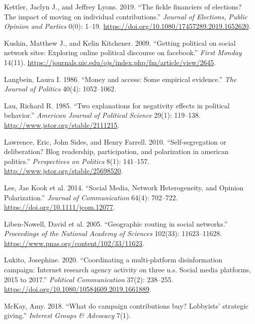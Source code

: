 \documentclass[12pt,]{article}
\begin{document}
\leavevmode\hypertarget{ref-kettler2019}{}%
Kettler, Jaclyn J., and Jeffrey Lyons. 2019. ``The fickle financiers of
elections? The impact of moving on individual contributions.''
\emph{Journal of Elections, Public Opinion and Parties} 0(0): 1--19.
\url{https://doi.org/10.1080/17457289.2019.1652620}.

\leavevmode\hypertarget{ref-kushin2009}{}%
Kushin, Matthew J., and Kelin Kitchener. 2009. ``Getting political on
social network sites: Exploring online political discourse on
facebook.'' \emph{First Monday} 14(11).
\url{https://journals.uic.edu/ojs/index.php/fm/article/view/2645}.

\leavevmode\hypertarget{ref-langbein1986}{}%
Langbein, Laura I. 1986. ``Money and access: Some empirical evidence.''
\emph{The Journal of Politics} 40(4): 1052--1062.

\leavevmode\hypertarget{ref-lau1985}{}%
Lau, Richard R. 1985. ``Two explanations for negativity effects in
political behavior.'' \emph{American Journal of Political Science}
29(1): 119--138. \url{http://www.jstor.org/stable/2111215}.

\leavevmode\hypertarget{ref-lawrence2010}{}%
Lawrence, Eric, John Sides, and Henry Farrell. 2010. ``Self-segregation
or deliberation? Blog readership, participation, and polarization in
american politics.'' \emph{Perspectives on Politics} 8(1): 141--157.
\url{http://www.jstor.org/stable/25698520}.

\leavevmode\hypertarget{ref-lee2014}{}%
Lee, Jae Kook et al. 2014. ``Social Media, Network Heterogeneity, and
Opinion Polarization.'' \emph{Journal of Communication} 64(4): 702--722.
\url{https://doi.org/10.1111/jcom.12077}.

\leavevmode\hypertarget{ref-liben2005}{}%
Liben-Nowell, David et al. 2005. ``Geographic routing in social
networks.'' \emph{Proceedings of the National Academy of Sciences}
102(33): 11623--11628. \url{https://www.pnas.org/content/102/33/11623}.

\leavevmode\hypertarget{ref-lukito2020}{}%
Lukito, Josephine. 2020. ``Coordinating a multi-platform disinformation
campaign: Internet research agency activity on three u.s. Social media
platforms, 2015 to 2017.'' \emph{Political Communication} 37(2):
238--255. \url{https://doi.org/10.1080/10584609.2019.1661889}.

\leavevmode\hypertarget{ref-mckay2018}{}%
McKay, Amy. 2018. ``What do campaign contributions buy? Lobbyists'
strategic giving.'' \emph{Interest Groups \& Advocacy} 7(1).
\end{document}
